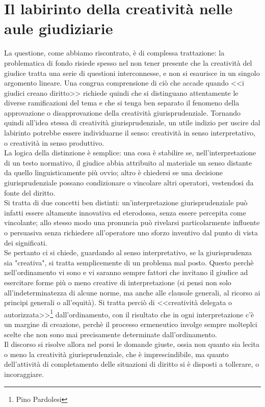 \section{Il labirinto della creatività nelle aule giudiziarie}
La questione, come abbiamo riscontrato, è di complessa trattazione: la problematica di fondo risiede spesso nel non tener presente che la creatività del giudice tratta una serie di questioni interconnesse, e non si esaurisce in un singolo argomento lineare.
Una congrua comprensione di ciò che accade quando <<i giudici creano diritto>> richiede quindi che si distinguano attentamente le diverse ramificazioni del tema e che si tenga ben separato il fenomeno della approvazione o disapprovazione della creatività giurisprudenziale.
Tornando quindi all'idea stessa di creatività giurisprudenziale, un utile indizio per uscire dal labirinto potrebbe essere individuarne il senso: creatività in senso interpretativo, o creatività in senso produttivo.
\\La logica della distinzione è semplice: una cosa è stabilire se, nell'interpretazione di un testo normativo, il giudice abbia attribuito al materiale un senso distante da quello linguisticamente più ovvio; altro è chiedersi se una decisione giurisprudenziale possano condizionare o vincolare altri operatori, vestendosi da fonte del diritto.
\\Si tratta di due concetti ben distinti: un'interpretazione giurisprudenziale può infatti essere altamente innovativa ed eterodossa, senza essere percepita come vincolante; allo stesso modo una pronuncia può rivelarsi particolarmente influente o persuasiva senza richiedere all'operatore uno sforzo inventivo dal punto di vista dei significati.
\\Se pertanto ci si chiede, guardando al senso interpretativo, se la giurisprudenza sia "creativa", si tratta semplicemente di un problema mal posto.
Questo perchè nell'ordinamento vi sono e vi saranno sempre fattori che invitano il giudice ad esercitare forme più o meno creative di interpretazione (si pensi non solo all'indeterminatezza di alcune norme, ma anche alle clausole generali, al ricorso ai principi generali o all'equità).
Si tratta perciò di <<creatività delegata o autorizzata>>\footnote{Pino Pardolesi} dall'ordinamento, con il risultato che in ogni interpretazione c'è un margine  di creazione, perchè il processo ermeneutico involge sempre molteplci scelte che non sono mai precisamente determinate dall'ordinamento.
\\Il discorso si risolve allora nel porsi le domande giuste, ossia non quanto sia lecita o meno la creatività giurisprudenziale, che è imprescindibile, ma quanto dell'attività di completamento delle situazioni di diritto si è disposti a tollerare, o incoraggiare.